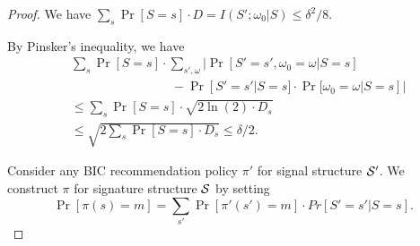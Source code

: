 \begin{proof}
We have
$\sum_{s} \Pr[S=s] \cdot D = I(S' ; \omega_0|S) \leq \delta^2/8$.

By Pinsker's inequality, we have
 
\begin{align*}
       &\sum_{s} \Pr[S = s]\cdot \sum_{s', \omega} | \Pr[S' = s', \omega_0 = \omega| S= s]\\
       & \qquad \qquad\qquad\qquad- \Pr[S'=s'|S=s] \cdot \Pr[\omega_0 = \omega|S=s]| \\
&\leq\textstyle  \sum_{s} \Pr[S=s] \cdot \sqrt{2 \ln(2)\cdot D_s  } \\
&\leq\textstyle   \sqrt{2 \sum_{s} \Pr[S=s] \cdot  D_s }
\leq  \delta /2.
\end{align*}

Consider any BIC recommendation policy $\pi'$ for signal structure $\S'$. We construct $\pi$ for signature structure $\S$ by setting
\[ \textstyle \Pr[\pi(s) = m] = \sum_{s'} \Pr[\pi'(s') = m] \cdot Pr[S' = s'|S = s].\]


\end{proof}
